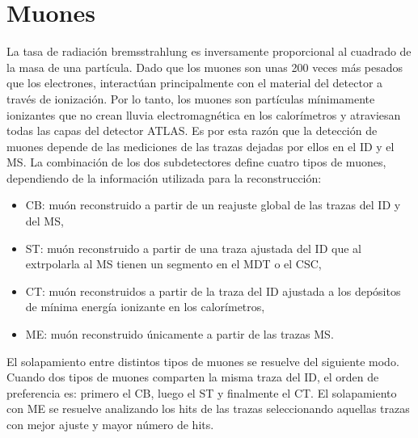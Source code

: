 \section{Muones}



La tasa de radiación bremsstrahlung es inversamente proporcional al cuadrado de la masa de una partícula. Dado que los muones son unas 200 veces más pesados que los electrones, interactúan principalmente con el material del detector a través de ionización. Por lo tanto, los muones son partículas mínimamente ionizantes que no crean lluvia electromagnética en los calorímetros y atraviesan todas las capas del detector \ac{ATLAS}. Es por esta razón que la detección de muones depende de las mediciones de las trazas dejadas por ellos en el \ac{ID} y el \ac{MS}. La combinación de los dos subdetectores define cuatro tipos de muones, dependiendo de la información utilizada para la reconstrucción:
\begin{itemize}
    \item \ac{CB}: muón reconstruido a partir de un reajuste global de las trazas del \ac{ID} y del \ac{MS},
    \item \ac{ST}: muón reconstruido a partir de una traza ajustada del \ac{ID} que al extrpolarla al \ac{MS} tienen un segmento en el \ac{MDT} o el \ac{CSC},
    \item \ac{CT}: muón reconstruidos a partir de la traza del \ac{ID} ajustada a los depósitos de mínima energía ionizante en los calorímetros,
    \item \ac{ME}: muón reconstruido únicamente a partir de las trazas \ac{MS}.
\end{itemize}

El solapamiento entre distintos tipos de muones se resuelve del siguiente modo. Cuando dos tipos de muones comparten la misma traza del \ac{ID}, el orden de preferencia es: primero el \ac{CB}, luego el \ac{ST} y finalmente el \ac{CT}. El solapamiento con \ac{ME} se resuelve analizando los hits de las trazas seleccionando aquellas trazas con mejor ajuste y mayor número de hits.


